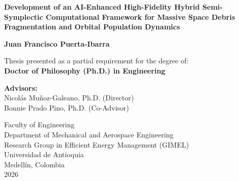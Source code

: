 \documentclass[12pt,letterpaper,oneside]{book}
\begin{document}
\frontmatter

\begin{titlepage}
\begin{center}
    \vspace*{0.5cm}
    {\LARGE \bfseries Development of an AI-Enhanced High-Fidelity Hybrid Semi-Symplectic Computational Framework for Massive Space Debris Fragmentation and Orbital Population Dynamics \par}
    
    \vspace{1.8cm}
    {\Large \textbf{Juan Francisco Puerta-Ibarra} \par}
    
    \vspace{2.0cm}
    {\normalsize Thesis presented as a partial requirement for the degree of: \\
    \textbf{Doctor of Philosophy (Ph.D.) in Engineering} \par}
    
    \vspace{2.0cm}
    {\normalsize
    \textbf{Advisors:} \\
    Nicolás Muñoz-Galeano, Ph.D. (Director) \\
    Bonnie Prado Pino, Ph.D. (Co-Advisor) \par}
    
    \vfill
    {\normalsize
    Faculty of Engineering \\
    Department of Mechanical and Aerospace Engineering \\
    Research Group in Efficient Energy Management (GIMEL) \\
    Universidad de Antioquia \\
    Medellín, Colombia \\
    2026 \par}
\end{center}
\end{titlepage}

\clearpage

\tableofcontents
\listoffigures
\listoftables

\clearpage

\mainmatter
\end{document}
